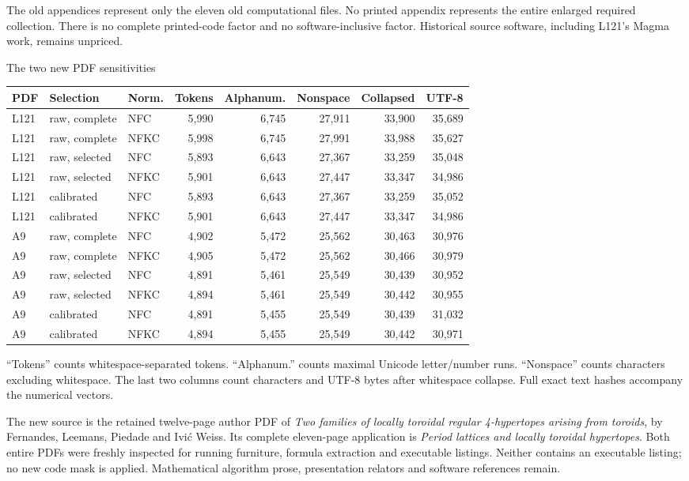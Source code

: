 \documentclass[10pt]{article}
\begin{document}
The old appendices represent only the eleven old computational files.
No printed appendix represents the entire enlarged required collection.
There is no complete printed-code factor and no software-inclusive factor.
Historical source software, including L121's Magma work, remains unpriced.
\newpage
\begin{center}{\large The two new PDF sensitivities}\end{center}
\begin{center}\scriptsize\setlength{\tabcolsep}{3.7pt}
\begin{tabular}{lllrrrrr}\toprule
PDF & Selection & Norm. & Tokens & Alphanum. & Nonspace & Collapsed & UTF-8\\\midrule
L121 & raw, complete & NFC & 5,990 & 6,745 & 27,911 & 33,900 & 35,689\\
L121 & raw, complete & NFKC & 5,998 & 6,745 & 27,991 & 33,988 & 35,627\\
L121 & raw, selected & NFC & 5,893 & 6,643 & 27,367 & 33,259 & 35,048\\
L121 & raw, selected & NFKC & 5,901 & 6,643 & 27,447 & 33,347 & 34,986\\
L121 & calibrated & NFC & 5,893 & 6,643 & 27,367 & 33,259 & 35,052\\
L121 & calibrated & NFKC & 5,901 & 6,643 & 27,447 & 33,347 & 34,986\\
A9 & raw, complete & NFC & 4,902 & 5,472 & 25,562 & 30,463 & 30,976\\
A9 & raw, complete & NFKC & 4,905 & 5,472 & 25,562 & 30,466 & 30,979\\
A9 & raw, selected & NFC & 4,891 & 5,461 & 25,549 & 30,439 & 30,952\\
A9 & raw, selected & NFKC & 4,894 & 5,461 & 25,549 & 30,442 & 30,955\\
A9 & calibrated & NFC & 4,891 & 5,455 & 25,549 & 30,439 & 31,032\\
A9 & calibrated & NFKC & 4,894 & 5,455 & 25,549 & 30,442 & 30,971\\
\bottomrule\end{tabular}\end{center}
``Tokens'' counts whitespace-separated tokens. ``Alphanum.'' counts maximal
Unicode letter/number runs. ``Nonspace'' counts characters excluding whitespace.
The last two columns count characters and UTF-8 bytes after whitespace collapse.
Full exact text hashes accompany the numerical vectors.

The new source is the retained twelve-page author PDF of \emph{Two families of
locally toroidal regular 4-hypertopes arising from toroids}, by Fernandes,
Leemans, Piedade and Ivi\'c Weiss. Its complete eleven-page application is
\emph{Period lattices and locally toroidal hypertopes}. Both entire PDFs were
freshly inspected for running furniture, formula extraction and executable
listings. Neither contains an executable listing; no new code mask is applied.
Mathematical algorithm prose, presentation relators and software references remain.
\end{document}

